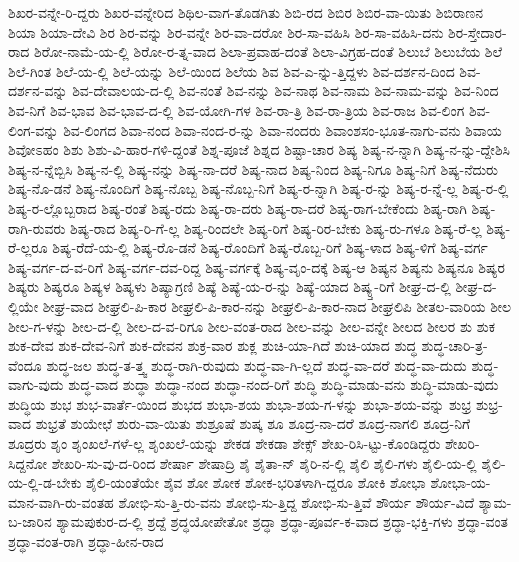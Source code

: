 {ಶಿಖರ-ವನ್ನೇ-ರಿ-ದ್ದರು
ಶಿಖರ-ವನ್ನೇರಿದ
ಶಿಥಿಲ-ವಾಗ-ತೊಡಗಿತು
ಶಿಬಿ-ರದ
ಶಿಬಿರ
ಶಿಬಿರ-ವಾ-ಯಿತು
ಶಿಬಿರಾಣನ
ಶಿಯಾ
ಶಿಯಾ-ದೇವಿ
ಶಿರ
ಶಿರ-ವನ್ನು
ಶಿರ-ವನ್ನೇ
ಶಿರ-ವಾ-ದರೋ
ಶಿರ-ಸಾ-ವಹಿಸಿ
ಶಿರ-ಸಾ-ವಹಿಸಿ-ದನು
ಶಿರ-ಸ್ತೇದಾರ-ರಾದ
ಶಿರೋ-ನಾಮೆ-ಯ-ಲ್ಲಿ
ಶಿರೋ-ರ-ತ್ನ-ವಾದ
ಶಿಲಾ-ಪ್ರವಾಹ-ದಂತೆ
ಶಿಲಾ-ವಿಗ್ರಹ-ದಂತೆ
ಶಿಲುಬೆ
ಶಿಲುಬೆಯ
ಶಿಲೆ
ಶಿಲೆ-ಗಿಂತ
ಶಿಲೆ-ಯ-ಲ್ಲಿ
ಶಿಲೆ-ಯನ್ನು
ಶಿಲೆ-ಯಿಂದ
ಶಿಲೆಯ
ಶಿವ
ಶಿವ-ಎ-ನ್ನು-ತ್ತಿದ್ದಳು
ಶಿವ-ದರ್ಶನ-ದಿಂದ
ಶಿವ-ದರ್ಶನ-ವನ್ನು
ಶಿವ-ದೇವಾಲಯ-ದ-ಲ್ಲಿ
ಶಿವ-ನಂತೆ
ಶಿವ-ನನ್ನು
ಶಿವ-ನಾಥ
ಶಿವ-ನಾಮ
ಶಿವ-ನಾಮ-ವನ್ನು
ಶಿವ-ನಿಂದ
ಶಿವ-ನಿಗೆ
ಶಿವ-ಭಾವ
ಶಿವ-ಭಾವ-ದ-ಲ್ಲಿ
ಶಿವ-ಯೋಗಿ-ಗಳ
ಶಿವ-ರಾ-ತ್ರಿ
ಶಿವ-ರಾ-ತ್ರಿಯ
ಶಿವ-ರಾಜ
ಶಿವ-ಲಿಂಗ
ಶಿವ-ಲಿಂಗ-ವನ್ನು
ಶಿವ-ಲಿಂಗದ
ಶಿವಾ-ನಂದ
ಶಿವಾ-ನಂದ-ರ-ನ್ನು
ಶಿವಾ-ನಂದರು
ಶಿವಾಂಶಸಂ-ಭೂತ-ನಾಗು-ವನು
ಶಿವಾಯ
ಶಿವೋಽಹಂ
ಶಿಶು
ಶಿಶು-ವಿ-ಹಾರ-ಗಳಿ-ದ್ದಂತೆ
ಶಿಶ್ನ-ಪೂಜೆ
ಶಿಶ್ನದ
ಶಿಷ್ಟಾ-ಚಾರ
ಶಿಷ್ಯ
ಶಿಷ್ಯ-ನ-ನ್ನಾಗಿ
ಶಿಷ್ಯ-ನ-ನ್ನು-ದ್ದೇಶಿಸಿ
ಶಿಷ್ಯ-ನ-ನ್ನೆಬ್ಬಿಸಿ
ಶಿಷ್ಯ-ನ-ಲ್ಲಿ
ಶಿಷ್ಯ-ನನ್ನು
ಶಿಷ್ಯ-ನಾ-ದರೆ
ಶಿಷ್ಯ-ನಾದ
ಶಿಷ್ಯ-ನಿಂದ
ಶಿಷ್ಯ-ನಿಗೂ
ಶಿಷ್ಯ-ನಿಗೆ
ಶಿಷ್ಯ-ನೆದುರು
ಶಿಷ್ಯ-ನೊ-ಡನೆ
ಶಿಷ್ಯ-ನೊಂದಿಗೆ
ಶಿಷ್ಯ-ನೊಬ್ಬ
ಶಿಷ್ಯ-ನೊಬ್ಬ-ನಿಗೆ
ಶಿಷ್ಯ-ರ-ನ್ನಾಗಿ
ಶಿಷ್ಯ-ರ-ನ್ನು
ಶಿಷ್ಯ-ರ-ನ್ನೆ-ಲ್ಲ
ಶಿಷ್ಯ-ರ-ಲ್ಲಿ
ಶಿಷ್ಯ-ರ-ಲ್ಲೊಬ್ಬರಾದ
ಶಿಷ್ಯ-ರಂತೆ
ಶಿಷ್ಯ-ರದು
ಶಿಷ್ಯ-ರಾ-ದರು
ಶಿಷ್ಯ-ರಾ-ದರೆ
ಶಿಷ್ಯ-ರಾಗ-ಬೇಕೆಂದು
ಶಿಷ್ಯ-ರಾಗಿ
ಶಿಷ್ಯ-ರಾಗಿ-ರುವರು
ಶಿಷ್ಯ-ರಾದ
ಶಿಷ್ಯ-ರಿ-ಗೆ-ಲ್ಲ
ಶಿಷ್ಯ-ರಿಂದಲೇ
ಶಿಷ್ಯ-ರಿಗೆ
ಶಿಷ್ಯ-ರಿರ-ಬೇಕು
ಶಿಷ್ಯ-ರು-ಗಳೂ
ಶಿಷ್ಯ-ರೆ-ಲ್ಲ
ಶಿಷ್ಯ-ರೆ-ಲ್ಲರೂ
ಶಿಷ್ಯ-ರೆದೆ-ಯ-ಲ್ಲಿ
ಶಿಷ್ಯ-ರೊ-ಡನೆ
ಶಿಷ್ಯ-ರೊಂದಿಗೆ
ಶಿಷ್ಯ-ರೊಬ್ಬ-ರಿಗೆ
ಶಿಷ್ಯ-ಳಾದ
ಶಿಷ್ಯ-ಳಿಗೆ
ಶಿಷ್ಯ-ವರ್ಗ
ಶಿಷ್ಯ-ವರ್ಗ-ದ-ವ-ರಿಗೆ
ಶಿಷ್ಯ-ವರ್ಗ-ದವ-ರಿದ್ದ
ಶಿಷ್ಯ-ವರ್ಗಕ್ಕೆ
ಶಿಷ್ಯ-ವೃಂ-ದಕ್ಕೆ
ಶಿಷ್ಯ-ಆ
ಶಿಷ್ಯನ
ಶಿಷ್ಯನು
ಶಿಷ್ಯನೂ
ಶಿಷ್ಯರ
ಶಿಷ್ಯರು
ಶಿಷ್ಯರೂ
ಶಿಷ್ಯಳ
ಶಿಷ್ಯಳು
ಶಿಷ್ಯಾಗ್ರಣಿ
ಶಿಷ್ಯೆ
ಶಿಷ್ಯೆ-ಯ-ರ-ನ್ನು
ಶಿಷ್ಯೆ-ಯಾದ
ಶಿಷ್ಯ್ತ-ರಿಗೆ
ಶೀಘ್ರ-ದ-ಲ್ಲಿ
ಶೀಘ್ರ-ದ-ಲ್ಲಿಯೇ
ಶೀಘ್ರ-ವಾದ
ಶೀಘ್ರಲಿ-ಪಿ-ಕಾರ
ಶೀಘ್ರಲಿ-ಪಿ-ಕಾರ-ನನ್ನು
ಶೀಘ್ರಲಿ-ಪಿ-ಕಾರ-ನಾದ
ಶೀಘ್ರಲಿಪಿ
ಶೀತಲ-ವಾರಿಯ
ಶೀಲ
ಶೀಲ-ಗ-ಳನ್ನು
ಶೀಲ-ದ-ಲ್ಲಿ
ಶೀಲ-ದ-ವ-ರಿಗೂ
ಶೀಲ-ವಂತ-ರಾದ
ಶೀಲ-ವನ್ನು
ಶೀಲ-ವನ್ನೇ
ಶೀಲದ
ಶೀಲರ
ಶು
ಶುಕ
ಶುಕ-ದೇವ
ಶುಕ-ದೇವ-ನಿಗೆ
ಶುಕ-ದೇವನ
ಶುಕ್ರ-ವಾರ
ಶುಕ್ಲ
ಶುಚಿ-ಯಾ-ಗಿದೆ
ಶುಚಿ-ಯಾದ
ಶುದ್ಧ
ಶುದ್ಧ-ಚಾರಿ-ತ್ರ-ವೆಂದೂ
ಶುದ್ಧ-ಜಲ
ಶುದ್ಧ-ತ-ತ್ತ್ವ
ಶುದ್ಧ-ರಾಗಿ-ರುವುದು
ಶುದ್ಧ-ವಾ-ಗಿ-ಲ್ಲದೆ
ಶುದ್ಧ-ವಾ-ದರೆ
ಶುದ್ಧ-ವಾ-ದುದು
ಶುದ್ಧ-ವಾಗು-ವುದು
ಶುದ್ಧ-ವಾದ
ಶುದ್ಧಾ
ಶುದ್ಧಾ-ನಂದ
ಶುದ್ಧಾ-ನಂದ-ರಿಗೆ
ಶುದ್ಧಿ
ಶುದ್ಧಿ-ಮಾಡು-ವನು
ಶುದ್ಧಿ-ಮಾಡು-ವುದು
ಶುದ್ಧಿಯ
ಶುಭ
ಶುಭ-ವಾರ್ತೆ-ಯಿಂದ
ಶುಭದ
ಶುಭಾ-ಶಯ
ಶುಭಾ-ಶಯ-ಗ-ಳನ್ನು
ಶುಭಾ-ಶಯ-ವನ್ನು
ಶುಭ್ರ
ಶುಭ್ರ-ವಾದ
ಶುಭ್ರತೆ
ಶುಯೇಛೆ
ಶುರು-ವಾ-ಯಿತು
ಶುಶ್ರೂಷೆ
ಶುಷ್ಕ
ಶೂ
ಶೂದ್ರ-ನಾ-ದರೆ
ಶೂದ್ರ-ನಾಗಲಿ
ಶೂದ್ರ-ನಿಗೆ
ಶೂದ್ರರು
ಶೃಂ
ಶೃಂಖಲೆ-ಗಳೆ-ಲ್ಲ
ಶೃಂಖಲೆ-ಯನ್ನು
ಶೇಕಡ
ಶೇಕಡಾ
ಶೇಕ್ಸ್
ಶೇಖ-ರಿಸಿ-ಟ್ಟು-ಕೊಂಡಿದ್ದರು
ಶೇಖರಿ-ಸಿದ್ದನೋ
ಶೇಖರಿ-ಸು-ವು-ದ-ರಿಂದ
ಶೇರ್ಷಾ
ಶೇಷಾದ್ರಿ
ಶೈ
ಶೈತಾ-ನ್
ಶೈರಿ-ನ-ಲ್ಲಿ
ಶೈಲಿ
ಶೈಲಿ-ಗಳು
ಶೈಲಿ-ಯ-ಲ್ಲಿ
ಶೈಲಿ-ಯ-ಲ್ಲಿ-ಡ-ಬೇಕು
ಶೈಲಿ-ಯಂತೆಯೇ
ಶೈವ
ಶೋ
ಶೋಕ
ಶೋಕ-ಭರಿತಳಾಗಿ-ದ್ದರೂ
ಶೋಕಿ
ಶೋಭಾ
ಶೋಭಾ-ಯ-ಮಾನ-ವಾಗಿ-ರು-ವಂತಹ
ಶೋಭಿ-ಸು-ತ್ತಿ-ರು-ವನು
ಶೋಭಿ-ಸು-ತ್ತಿದ್ದ
ಶೋಭಿ-ಸು-ತ್ತಿವೆ
ಶೌರ್ಯ
ಶೌರ್ಯ-ವಿದೆ
ಶ್ಯಾಮ-ಬ-ಜಾರಿನ
ಶ್ಯಾಮಪುಕುರ-ದ-ಲ್ಲಿ
ಶ್ರದ್ದೆ
ಶ್ರದ್ಧಯೋಪೇತೋ
ಶ್ರದ್ಧಾ
ಶ್ರದ್ಧಾ-ಪೂರ್ವ-ಕ-ವಾದ
ಶ್ರದ್ಧಾ-ಭಕ್ತಿ-ಗಳು
ಶ್ರದ್ಧಾ-ವಂತ
ಶ್ರದ್ಧಾ-ವಂತ-ರಾಗಿ
ಶ್ರದ್ಧಾ-ಹೀನ-ರಾದ
}

